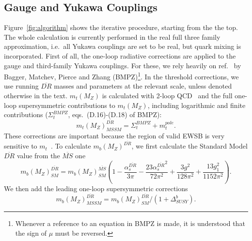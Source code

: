 \documentclass{article}
\begin{document}
\subsection{Gauge and Yukawa Couplings}

Figure~\ref{fig:algorithm} shows the iterative procedure, starting from the the
top. The whole calculation is currently performed in the real full three family
approximation, i.e.\ all Yukawa couplings are set to be real, but quark mixing
is incorporated.
First of all, the one-loop radiative corrections are applied to the gauge
and third-family Yukawa couplings. For these, we rely heavily on
ref.~\cite{Pierce:1997zz}
by Bagger, Matchev, Pierce and Zhang (BMPZ)\footnote{Whenever a reference to
an equation in BMPZ is made, it is understood that the sign of $\mu$ must be
reversed.}.
In the threshold corrections, we use running $\overline{DR}$
masses and parameters at the relevant scale, unless denoted otherwise in the
text. 
$m_t(M_Z)$ is calculated with 2-loop QCD~\cite{avdeev} and
the full one-loop supersymmetric
contributions to $m_t(M_Z)$, including logarithmic and finite contributions
($\Sigma_t^{BMPZ}$, eqs.~(D.16)-(D.18) of BMPZ):
\begin{equation}
m_t(M_Z)^{\overline{DR}}_{MSSM} = \Sigma_t^{BMPZ} + m_t^{pole}. 
\end{equation}
These corrections are important because the region of valid EWSB is very
sensitive to $m_t$~\cite{Allanach:2000ii}. 
To calculate $m_b(M_Z)^{\overline{DR}}$, we first calculate the Standard Model
$\overline{DR}$ value from the $\overline{MS}$ one~\cite{avdeev,bottomMass}
\begin{equation}
m_b(M_Z)^{\overline{DR}}_{SM} =
m_b(M_Z)^{\overline{MS}}_{SM} \left(1 - \frac{\alpha_s^{\overline{DR}}}{3 \pi}
- \frac{23 
  {\alpha_s^{\overline{DR}}}^2}{72 \pi^2} + 
\frac{3 g^2}{128 \pi^2} + \frac{13 g_1^2}{1152 \pi^2} \right).
\end{equation}
We then add the leading one-loop supersymmetric corrections
\begin{equation}
m_b(M_Z)^{\overline{DR}}_{MSSM}=m_b(M_Z)^{\overline{DR}}_{SM} / (1 +
  \Delta_{SUSY}^b).
\end{equation}
\end{document}
